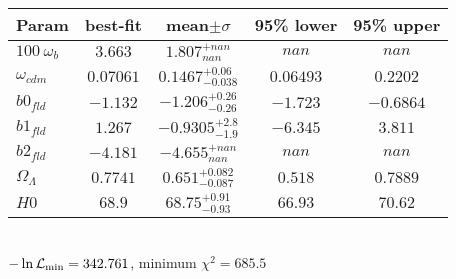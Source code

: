 \begin{tabular}{|l|c|c|c|c|} 
 \hline 
Param & best-fit & mean$\pm\sigma$ & 95\% lower & 95\% upper \\ \hline 
$100~\omega_{b }$ &$3.663$ & $1.807_{nan}^{+nan}$ & $nan$ & $nan$ \\ 
$\omega_{cdm }$ &$0.07061$ & $0.1467_{-0.038}^{+0.06}$ & $0.06493$ & $0.2202$ \\ 
$b0_{fld }$ &$-1.132$ & $-1.206_{-0.26}^{+0.26}$ & $-1.723$ & $-0.6864$ \\ 
$b1_{fld }$ &$1.267$ & $-0.9305_{-1.9}^{+2.8}$ & $-6.345$ & $3.811$ \\ 
$b2_{fld }$ &$-4.181$ & $-4.655_{nan}^{+nan}$ & $nan$ & $nan$ \\ 
$\Omega_{\Lambda }$ &$0.7741$ & $0.651_{-0.087}^{+0.082}$ & $0.518$ & $0.7889$ \\ 
$H0$ &$68.9$ & $68.75_{-0.93}^{+0.91}$ & $66.93$ & $70.62$ \\ 
\hline 
 \end{tabular} \\ 
$-\ln{\cal L}_\mathrm{min} =342.761$, minimum $\chi^2=685.5$ \\ 
